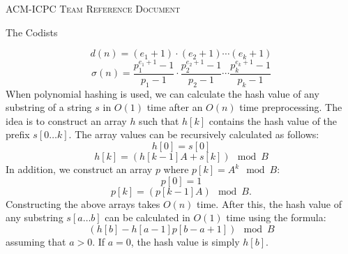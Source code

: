 \documentclass[letterpaper,12pt]{article} %
\begin{document}
  \thispagestyle{fancy}
  
  \begin{center}
    \Huge\textsc{ACM-ICPC Team Reference Document}

    \huge The Codists

    \vspace{0.50cm}
  \end{center}
  
  \begin{multicols*}{2}
    \tableofcontents
  \end{multicols*}
  
  \enlargethispage*{\baselineskip}
  \pagebreak
  
  
  \setcounter{page}{1}
  \begin{multicols*}{2}
    
    \[
    d(n) = (e_1 + 1) \cdot (e_2 + 1) \cdots (e_k + 1)
    \]
    \[
    \sigma(n) = \frac{p_1^{e_1+1} - 1}{p_1 - 1} \cdot \frac{p_2^{e_2+1} - 1}{p_2 - 1} \cdots \frac{p_k^{e_k+1} - 1}{p_k - 1}
    \]
    When polynomial hashing is used, we can calculate the hash value of any substring of a string \( s \) in \( O(1) \) time after an \( O(n) \) time preprocessing. The idea is to construct an array \( h \) such that \( h[k] \) contains the hash value of the prefix \( s[0 \dots k] \). The array values can be recursively calculated as follows:
    \[
    h[0] = s[0]
    \]
    \[
    h[k] = (h[k - 1] A + s[k]) \mod B
    \]
    In addition, we construct an array \( p \) where \( p[k] = A^k \mod B \):
    \[
    p[0] = 1
    \]
    \[
    p[k] = (p[k - 1] A) \mod B.
    \]
    Constructing the above arrays takes \( O(n) \) time. After this, the hash value of any substring \( s[a \dots b] \) can be calculated in \( O(1) \) time using the formula:
    \[
    (h[b] - h[a - 1] p[b - a + 1]) \mod B
    \]
    assuming that \( a > 0 \). If \( a = 0 \), the hash value is simply \( h[b] \).
  \end{multicols*}
\end{document}
